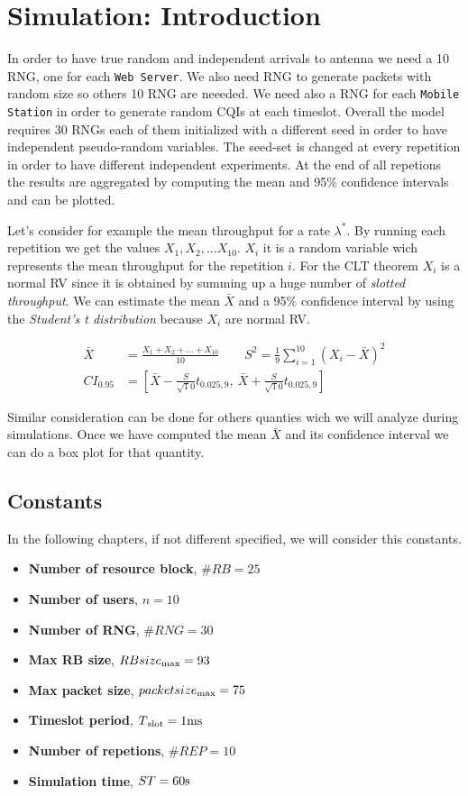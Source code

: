 \chapter{Simulation: Introduction}

In order to have true random and independent arrivals to antenna we need a 10 RNG, one for each \texttt{Web Server}. We also need RNG to generate packets with random size so others 10 RNG are neeeded. We need also a RNG for each \texttt{Mobile Station} in order to generate random CQIs at each timeslot. Overall the model requires 30 RNGs each of them initialized with a different seed in order to have independent pseudo-random variables. The seed-set is changed at every repetition in order to have different independent experiments. At the end of all repetions the results are aggregated by computing the mean and 95\% confidence intervals and can be plotted. 

Let's consider for example the mean throughput for a rate \(\lambda^{*}\). By running each repetition we get the values \(X_{1},X_{2},\ldots X_{10}\). \(X_{i}\) it is a random variable wich represents the mean throughput for the repetition \(i\). For the CLT theorem \(X_{i}\) is a normal RV since it is obtained by summing up a huge number of \textit{slotted throughput}. We can estimate the mean \(\bar{X}\) and a 95\% confidence interval by using the \textit{Student's t distribution} because \(X_{i}\) are normal RV. 

\begin{align}
	\bar{X} &= \frac{X_{1}+X_{2}+\ldots+X_{10}}{10} \qquad S^{2} = \frac{1}{9}\sum_{i=1}^{10}(X_{i} - \bar{X})^{2} \\
	CI_{0.95} &= \left[\bar{X} - \frac{S}{\sqrt10}t_{0.025,9}, \: \bar{X} + \frac{S}{\sqrt10}t_{0.025,9}\right]
\end{align}

Similar consideration can be done for others quanties wich we will analyze during simulations. Once we have computed the mean \(\bar{X}\) and its confidence interval we can do a box plot for that quantity. 

\section{Constants}
In the following chapters, if not different specified, we will consider this constants.
\begin{itemize}
\item \textbf{Number of resource block}, \(\#RB = 25\)
\item \textbf{Number of users}, \(n = 10\)
\item \textbf{Number of RNG}, \(\#RNG = 30\)
\item \textbf{Max RB size}, \(RBsize\textsubscript{max} = 93\)
\item \textbf{Max packet size}, \(packetsize\textsubscript{max} = 75\)
\item \textbf{Timeslot period}, \(T\textsubscript{slot} = 1\textnormal{ms}\)
\item \textbf{Number of repetions}, \(\#REP = 10\)
\item \textbf{Simulation time}, \(ST = 60 \textnormal{s}\)
\end{itemize}
